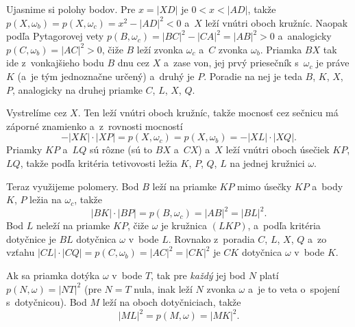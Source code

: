 {    Ujasnime si polohy bodov. Pre $x=|XD|$ je $0 < x < |AD|$, takže $p(X,\omega_b) = p(X,\omega_c) = x^2 - |AD|^2 < 0$ a~$X$ leží vnútri oboch kružníc. Naopak podľa Pytagorovej vety $p(B,\omega_c) = |BC|^2 - |CA|^2 = |AB|^2 > 0$ a~analogicky $p(C,\omega_b) = |AC|^2 > 0$, čiže $B$ leží zvonka $\omega_c$ a~$C$ zvonka $\omega_b$. Priamka $BX$ tak ide z~vonkajšieho bodu $B$ dnu cez $X$ a~zase von, jej prvý priesečník s~$\omega_c$ je práve $K$ (a~je tým jednoznačne určený) a~druhý je $P$. Poradie na nej je teda $B$, $K$, $X$, $P$, analogicky na druhej priamke $C$, $L$, $X$, $Q$.

    Vystrelíme cez $X$. Ten leží vnútri oboch kružníc, takže mocnosť cez sečnicu má záporné znamienko a~z~rovnosti mocností
    $$
    -|XK| \cdot |XP| = p(X,\omega_c) = p(X,\omega_b) = -|XL| \cdot |XQ|.
    $$
    Priamky $KP$ a~$LQ$ sú rôzne (sú to $BX$ a~$CX$) a~$X$ leží vnútri oboch úsečiek $KP$, $LQ$, takže podľa kritéria tetivovosti ležia $K$, $P$, $Q$, $L$ na jednej kružnici $\omega$.

    Teraz využijeme polomery. Bod $B$ leží na priamke $KP$ mimo úsečky $KP$ a~body $K$, $P$ ležia na $\omega_c$, takže
    $$
    |BK| \cdot |BP| = p(B,\omega_c) = |AB|^2 = |BL|^2.
    $$
    Bod $L$ neleží na priamke $KP$, čiže $\omega$ je kružnica $(LKP)$, a~podľa kritéria dotyčnice je $BL$ dotyčnica $\omega$ v~bode $L$. Rovnako z~poradia $C$, $L$, $X$, $Q$ a~zo vzťahu $|CL| \cdot |CQ| = p(C,\omega_b) = |AC|^2 = |CK|^2$ je $CK$ dotyčnica $\omega$ v~bode $K$.

    Ak sa priamka dotýka $\omega$ v~bode $T$, tak pre \textit{každý} jej bod $N$ platí $p(N,\omega) = |NT|^2$ (pre $N=T$ nula, inak leží $N$ zvonka $\omega$ a~je to veta o~spojení s~dotyčnicou). Bod $M$ leží na oboch dotyčniciach, takže
    $$
    |ML|^2 = p(M,\omega) = |MK|^2.
    $$
}

